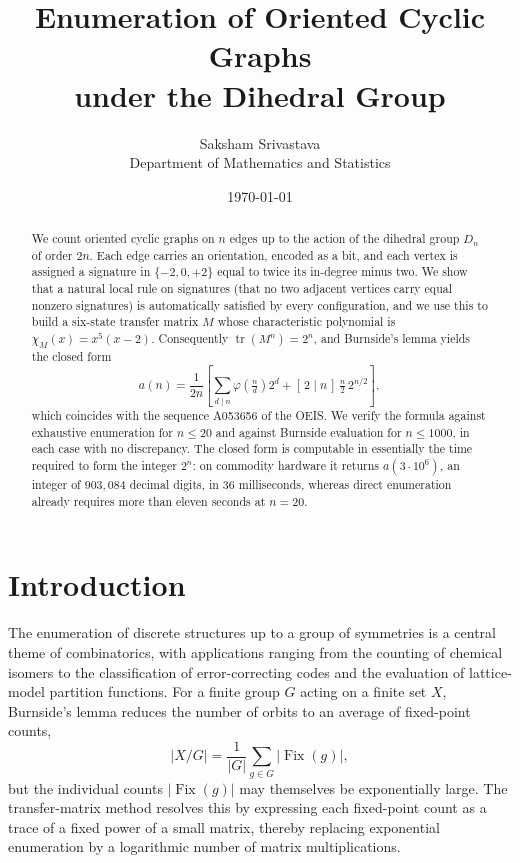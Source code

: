 \documentclass[11pt,a4paper]{article}
\title{\bfseries Enumeration of Oriented Cyclic Graphs\\ under the Dihedral Group}
\author{Saksham Srivastava\\[2pt]\small Department of Mathematics and Statistics}
\date{\today}
\theoremstyle{plain}
\theoremstyle{definition}
\theoremstyle{remark}
\DeclareMathOperator{\tr}{tr}
\DeclareMathOperator{\Fix}{Fix}
\newcommand{\Dih}{D_{n}}
\numberwithin{equation}{section}
\begin{document}
\maketitle
\thispagestyle{empty}

\begin{abstract}
\noindent
We count oriented cyclic graphs on $n$ edges up to the action of the
dihedral group $\Dih$ of order $2n$. Each edge carries an orientation,
encoded as a bit, and each vertex is assigned a signature in
$\{-2,0,+2\}$ equal to twice its in-degree minus two. We show that a
natural local rule on signatures (that no two adjacent vertices
carry equal nonzero signatures) is automatically satisfied by every
configuration, and we use this to build a six-state transfer matrix $M$
whose characteristic polynomial is $\chi_M(x)=x^{5}(x-2)$. Consequently
$\tr(M^{n})=2^{n}$, and Burnside's lemma yields the closed form
\[
a(n)=\frac{1}{2n}\!\left[\sum_{d\mid n}\varphi\!\left(\tfrac{n}{d}\right)2^{d}
      +[\,2\mid n\,]\,\tfrac{n}{2}\,2^{n/2}\right],
\]
which coincides with the sequence \textup{A053656} of the OEIS. We verify
the formula against exhaustive enumeration for $n\le 20$ and against
Burnside evaluation for $n\le 1000$, in each case with no discrepancy.
The closed form is computable in essentially the time required to form the
integer $2^{n}$: on commodity hardware it returns $a(3\cdot10^{6})$, an
integer of $903{,}084$ decimal digits, in $36$ milliseconds, whereas
direct enumeration already requires more than eleven seconds at $n=20$.
\end{abstract}

\clearpage
\tableofcontents
\thispagestyle{empty}
\clearpage

\section{Introduction}\label{sec:intro}

The enumeration of discrete structures up to a group of symmetries is a
central theme of combinatorics, with applications ranging from the
counting of chemical isomers to the classification of error-correcting
codes and the evaluation of lattice-model partition functions. For a
finite group $G$ acting on a finite set $X$, Burnside's lemma reduces the
number of orbits to an average of fixed-point counts,
\[
|X/G|=\frac{1}{|G|}\sum_{g\in G}|\Fix(g)|,
\]
but the individual counts $|\Fix(g)|$ may themselves be exponentially
large. The transfer-matrix method resolves this by expressing each
fixed-point count as a trace of a fixed power of a small matrix, thereby
replacing exponential enumeration by a logarithmic number of matrix
multiplications.
\end{document}
